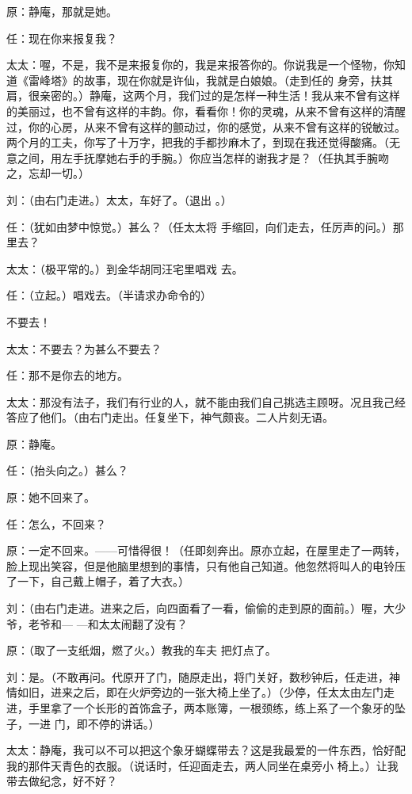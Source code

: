 \documentclass{article}
\begin{document}
原：静庵，那就是她。 


任：现在你来报复我？ 

太太：喔，不是，我不是来报复你的，我是来报答你的。你说我是一个怪物，你知道《雷峰塔》的故事，现在你就是许仙，我就是白娘娘。（走到任的
\newpage
身旁，扶其肩，很亲密的。）静庵，这两个月，我们过的是怎样一种生活！我从来不曾有这样的美丽过，也不曾有这样的丰韵。你，看看你！你的灵魂，从来不曾有这样的清醒过，你的心房，从来不曾有这样的颤动过，你的感觉，从来不曾有这样的锐敏过。两个月的工夫，你写了十万字，把我的手都抄麻木了，到现在我还觉得酸痛。（无意之间，用左手抚摩她右手的手腕。）你应当怎样的谢我才是？（任执其手腕吻
之，忘却一切。） 

刘：（由右门走进。）太太，车好了。（退出
。） 

任：（犹如由梦中惊觉。）甚么？（任太太将
手缩回，向们走去，任厉声的问。）那里去？ 

太太：（极平常的。）到金华胡同汪宅里唱戏
去。 

任：（立起。）唱戏去。（半请求办命令的）

\newpage
不要去！ 


太太：不要去？为甚么不要去？ 


任：那不是你去的地方。 

太太：那没有法子，我们有行业的人，就不能由我们自己挑选主顾呀。况且我己经答应了他们。（由右门走出。任复坐下，神气颇丧。二人片刻无语。


原：静庵。 


任：（抬头向之。）甚么？ 


原：她不回来了。 


任：怎么，不回来？ 

原：一定不回来。——可惜得很！（任即刻奔出。原亦立起，在屋里走了一两转，脸上现出笑容，但是他脑里想到的事情，只有他自己知道。他忽然将叫人的电铃压了一下，自己戴上帽子，着了大衣。）
\newpage


刘：（由右门走进。进来之后，向四面看了一看，偷偷的走到原的面前。）喔，大少爷，老爷和—
—和太太闹翻了没有？ 

原：（取了一支纸烟，燃了火。）教我的车夫
把灯点了。 

刘：是。（不敢再问。代原开了门，随原走出，将门关好，数秒钟后，任走进，神情如旧，进来之后，即在火炉旁边的一张大椅上坐了。）（少停，任太太由左门走进，手里拿了一个长形的首饰盒子，两本账簿，一根颈练，练上系了一个象牙的坠子，一进
门，即不停的讲话。） 

太太：静庵，我可以不可以把这个象牙蝴蝶带去？这是我最爱的一件东西，恰好配我的那件天青色的衣服。（说话时，任迎面走去，两人同坐在桌旁小
椅上。）让我带去做纪念，好不好？ 
\end{document}
